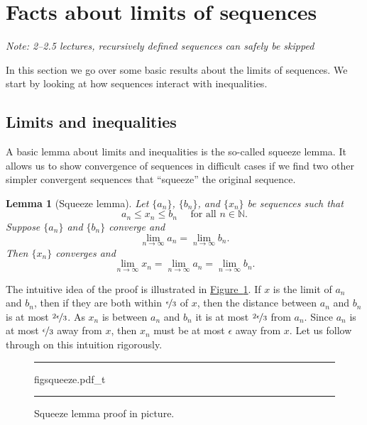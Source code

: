 \documentclass[12pt]{book}
\newenvironment{myfigureht}{%
\begin{figure}[h!t]
\noindent\rule{\textwidth}{0.4pt}\vspace{12pt}\par\centering}%
{\par\noindent\rule{\textwidth}{0.4pt}
\end{figure}}
\newcommand{\N}{{\mathbb{N}}}
\newcommand{\sectionnotes}[1]{\noindent \emph{Note: #1} \medskip \par}
\newcommand{\sectionnewpage}{\clearpage}
\theoremstyle{plain}
\newtheorem{lemma}[thm]{Lemma}
\theoremstyle{remark}
\theoremstyle{definition}
\theoremstyle{exercise}
\theoremstyle{example}
\newcommand{\figureref}[1]{\hyperref[#1]{Figure~\ref*{#1}}}
\begin{document}

\sectionnewpage
\section{Facts about limits of sequences}
\label{sec:factslimsseqs}

\sectionnotes{2--2.5 lectures, recursively defined sequences can safely be
skipped}

In this section we go over some basic results about the limits of
sequences.
We start by looking at how sequences interact with inequalities.

\subsection{Limits and inequalities}

A basic lemma about limits and inequalities is the so-called squeeze lemma.
It allows us to show convergence of sequences in difficult cases
if we find two other simpler convergent sequences that 
``squeeze'' the original sequence.

\begin{lemma}[Squeeze lemma] \label{squeeze:lemma}
Let $\{ a_n \}$, 
$\{ b_n \}$, and 
$\{ x_n \}$ be sequences such that
\begin{equation*}
a_n \leq x_n \leq b_n \quad \text{ for all $n \in \N$} .
\end{equation*}
Suppose $\{ a_n \}$ and $\{ b_n \}$ converge and
\begin{equation*}
\lim_{n\to \infty} a_n
=
\lim_{n\to \infty} b_n .
\end{equation*}
Then $\{ x_n \}$ converges and
\begin{equation*}
\lim_{n\to \infty} x_n
=
\lim_{n\to \infty} a_n
=
\lim_{n\to \infty} b_n .
\end{equation*}
\end{lemma}

The intuitive idea of the proof is illustrated in
\figureref{figsqueeze}.
If $x$ is the limit of $a_n$ and $b_n$, then if they are both within
$\nicefrac{\epsilon}{3}$ of $x$, then the distance between $a_n$ and $b_n$
is at most $\nicefrac{2\epsilon}{3}$.  As $x_n$ is between $a_n$ and $b_n$
it is at most $\nicefrac{2\epsilon}{3}$ from $a_n$.  Since $a_n$ is
at most $\nicefrac{\epsilon}{3}$ away from $x$, then $x_n$ must be at
most $\epsilon$ away from $x$.  Let us follow through on this intuition
rigorously.
\begin{myfigureht}
\newcommand{\ltepsilon}{< \nicefrac{2\epsilon}{3} + \nicefrac{\epsilon}{3} =
\epsilon}
{figsqueeze.pdf_t}
\caption{Squeeze lemma proof in picture.\label{figsqueeze}}
\end{myfigureht}
\end{document}

